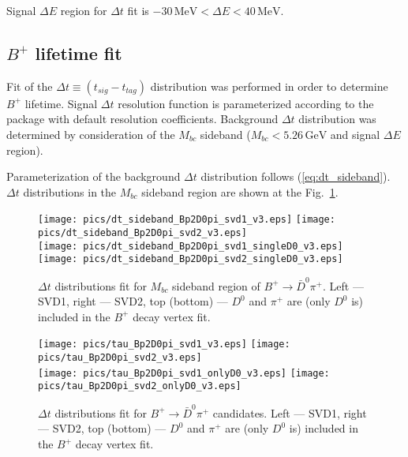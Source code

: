 \documentclass[preprint,aps,showpacs]{revtex4}
\newcommand{\bptodpi}{\ensuremath{B^{+}\to \bar D^0\pi^+}\xspace}
\begin{document}
Signal $\Delta E$ region for $\Delta t$ fit is $-30\,\text{MeV}<\Delta E<40\,\text{MeV}$.

\subsection{$B^+$ lifetime fit}
Fit of the $\Delta t\equiv \left(t_{sig}-t_{tag}\right)$ distribution was performed in order to determine $B^+$ lifetime. Signal $\Delta t$ resolution function is parameterized according to the \verb@TATAMI@ package with default resolution coefficients. Background $\Delta t$ distribution was determined by consideration of the $M_{bc}$ sideband ($M_{bc}<5.26\,\text{GeV}$ and signal $\Delta E$ region).
 
Parameterization of the background $\Delta t$ distribution follows (\ref{eq:dt_sideband}). $\Delta t$ distributions in the $M_{bc}$ sideband region are shown at the Fig.~\ref{fig:bp2d0pi_sideband}.


\begin{figure}[htb]
\texttt{[image: pics/dt\_sideband\_Bp2D0pi\_svd1\_v3.eps]}
\texttt{[image: pics/dt\_sideband\_Bp2D0pi\_svd2\_v3.eps]}\\
\texttt{[image: pics/dt\_sideband\_Bp2D0pi\_svd1\_singleD0\_v3.eps]}
\texttt{[image: pics/dt\_sideband\_Bp2D0pi\_svd2\_singleD0\_v3.eps]}\\
\caption{$\Delta t$ distributions fit for $M_{bc}$ sideband region of \bptodpi. Left --- SVD1, right --- SVD2, top (bottom) --- $D^0$ and $\pi^+$ are (only $D^0$ is) included in the $B^+$ decay vertex fit.}
\label{fig:bp2d0pi_sideband}
\end{figure}
 
\begin{figure}[htb]
\texttt{[image: pics/tau\_Bp2D0pi\_svd1\_v3.eps]}
\texttt{[image: pics/tau\_Bp2D0pi\_svd2\_v3.eps]}\\
\texttt{[image: pics/tau\_Bp2D0pi\_svd1\_onlyD0\_v3.eps]}
\texttt{[image: pics/tau\_Bp2D0pi\_svd2\_onlyD0\_v3.eps]}\\
\caption{$\Delta t$ distributions fit for \bptodpi candidates. Left --- SVD1, right --- SVD2, top (bottom) --- $D^0$ and $\pi^+$ are (only $D^0$ is) included in the $B^+$ decay vertex fit.}
\label{fig:bp2d0pi_tau}
\end{figure}
\end{document}
